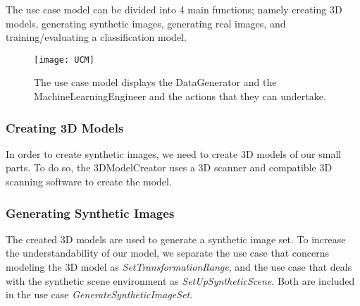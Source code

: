 The use case model can be divided into 4 main functions; namely creating 3D models, generating synthetic images, generating real images, and training/evaluating a classification model.

\begin{figure}[h]
\centering
  \texttt{[image: UCM]}
\caption{The use case model displays the DataGenerator and the MachineLearningEngineer and the actions that they can undertake.}
\label{fig:UCM}
\end{figure}

\clearpage
\subsubsection{Creating 3D Models}
In order to create synthetic images, we need to create 3D models of our small parts. To do so, the 3DModelCreator uses a 3D scanner and compatible 3D scanning software to create the model.

\begin{usecase}





\end{usecase}

\newpage
\subsubsection{Generating Synthetic Images}
The created 3D models are used to generate a synthetic image set. To increase the understandability of our model, we separate the use case that concerns modeling the 3D model as \textit{SetTransformationRange}, and the use case that deals with the synthetic scene environment as \textit{SetUpSyntheticScene}. Both are included in the use case \textit{GenerateSyntheticImageSet}.

